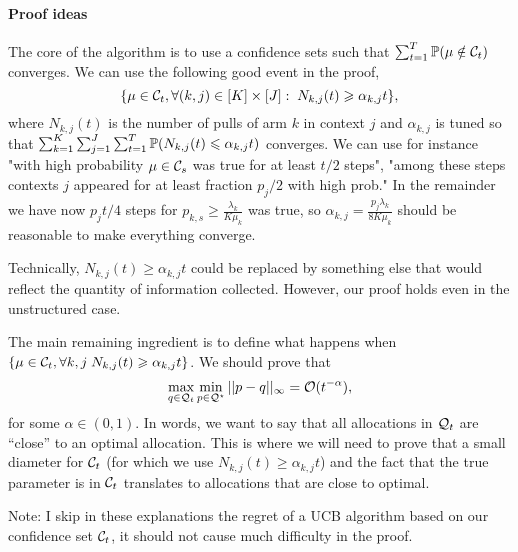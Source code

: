 \paragraph{Proof ideas} The core of the algorithm is to use a confidence sets such that $\sum_{t=1}^T \mathbb{P}(\mu \notin \mathcal{C}_t)$ converges. We can use the following good event in the proof, \[\{\mu \in \mathcal{C}_t, \forall (k,j) \in [K]\times [J]: \; N_{k,j}(t)  \geqslant \alpha_{k,j} t \},\] where $N_{k,j}(t)$ is the number of pulls of arm $k$ in context $j$ and $\alpha_{k, j}$ is tuned so that $\sum_{k=1}^K \sum_{j=1}^J \sum_{t=1}^T \mathbb{P}(N_{k,j}(t)\leqslant \alpha_{k,j}t)$ converges. We can use for instance "with high probability $\mu\in \mathcal{C}_s$ was true for at least $t/2$ steps", "among these steps contexts $j$ appeared for at least fraction $p_j/2$ with high prob." In the remainder we have now $p_jt/4$ steps for $p_{k,s}\geq \frac{\lambda_k}{K\mu_k}$ was true, so  $\alpha_{k,j}= \frac{p_j\lambda_k}{8K\mu_k}$ should be reasonable to make everything converge.

Technically, $N_{k,j}(t)\geq \alpha_{k,j}t$ could be replaced by something else that would reflect the quantity of information collected. However, our proof holds even in the unstructured case.

The main remaining ingredient is to define what happens when $\{\mu \in \mathcal{C}_t, \forall k,j \; N_{k,j}(t)  \geqslant \alpha_{k,j} t\}$. We should prove that 
\[\max_{q \in \mathcal{Q}_t} \min_{p \in \mathcal{Q}^\star} ||p-q ||_\infty = \mathcal{O}(t^{-\alpha}), \]
for some $\alpha \in (0, 1)$. In words, we want to say that all allocations in $\mathcal{Q}_t$ are ``close'' to an optimal allocation. This is where we will need to prove that a small diameter for $\mathcal{C}_t$ (for which we use $N_{k,j}(t)  \geq \alpha_{k,j} t$) and the fact that the true parameter is in $\mathcal{C}_t$ translates to allocations that are close to optimal.

Note: I skip in these explanations the regret of a UCB algorithm based on our confidence set $\mathcal{C}_t$, it should not cause much difficulty in the proof.




